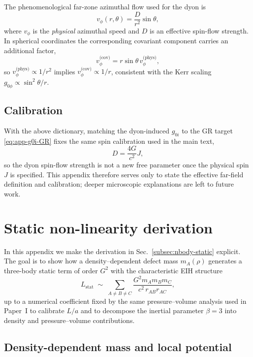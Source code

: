 \documentclass[11pt]{article}
\begin{document}
The phenomenological far-zone azimuthal flow used for the dyon is
\begin{equation}
  v_\phi(r,\theta)=\frac{D}{r^2}\sin\theta,
\end{equation}
where $v_\phi$ is the \emph{physical} azimuthal speed and $D$ is an effective
spin-flow strength.
In spherical coordinates the corresponding covariant component carries an
additional factor,
\begin{equation}
  v_{\phi}^{\text{(cov)}} = r\sin\theta\, v_{\phi}^{\text{(phys)}},
\end{equation}
so $v_\phi^{\text{(phys)}}\propto 1/r^2$ implies
$v_{\phi}^{\text{(cov)}}\propto 1/r$, consistent with the Kerr scaling
$g_{0\phi}\propto \sin^2\theta/r$.

\subsection{Calibration}

With the above dictionary, matching the dyon-induced $g_{0i}$ to the GR target
\eqref{eq:app-g0i-GR} fixes the same spin calibration used in the main text,
\begin{equation}
  D=\frac{4G}{c^2}J,
\end{equation}
so the dyon spin-flow strength is not a new free parameter once the physical
spin $J$ is specified.
This appendix therefore serves only to state the effective far-field definition
and calibration; deeper microscopic explanations are left to future work.

\section{Static non-linearity derivation}
\label{app:static-derivation}

In this appendix we make the derivation in
Sec.~\ref{subsec:nbody-static} explicit.
The goal is to show how a density--dependent defect mass
$m_A(\rho)$ generates a three-body static term of order $G^2$ with
the characteristic EIH structure
\begin{equation}
  L_{\text{stat}}
  \;\sim\;
  \sum_{A\neq B\neq C}
  \frac{G^2 m_A m_B m_C}{c^2\, r_{AB} r_{AC}},
\end{equation}
up to a numerical coefficient fixed by the same pressure--volume
analysis used in Paper~I to calibrate $L/a$ and to decompose the
inertial parameter $\beta=3$ into density and pressure--volume
contributions.

\subsection{Density-dependent mass and local potential}
\end{document}
